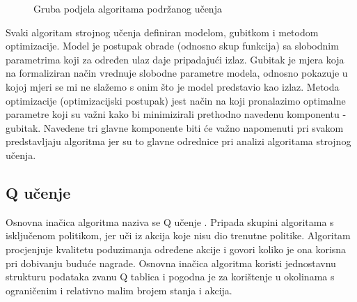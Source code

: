 
\begin{figure}[H]
    \centering
    \caption{Gruba podjela algoritama podržanog učenja \cite{RLAlgos}}
    \label{fig:rl-algorithms}
\end{figure}



Svaki algoritam strojnog učenja definiran modelom, gubitkom i metodom optimizacije. Model je postupak obrade (odnosno skup funkcija) sa slobodnim parametrima koji za određen ulaz daje pripadajući izlaz. Gubitak je mjera koja na formaliziran način vrednuje slobodne parametre modela, odnosno pokazuje u kojoj mjeri se mi ne slažemo s onim što je model predstavio kao izlaz. Metoda optimizacije (optimizacijski postupak) jest način na koji pronalazimo optimalne parametre koji su važni kako bi minimizirali prethodno navedenu komponentu - gubitak. Navedene tri glavne komponente biti će važno napomenuti pri svakom predstavljaju algoritma jer su to glavne odrednice pri analizi algoritama strojnog učenja.

\subsection{Q učenje}

Osnovna inačica algoritma naziva se Q učenje . Pripada skupini algoritama s isključenom politikom, jer uči iz akcija koje nisu dio trenutne politike. Algoritam procjenjuje kvalitetu  poduzimanja određene akcije i govori koliko je ona korisna pri dobivanju buduće nagrade. Osnovna inačica algoritma koristi jednostavnu strukturu podataka zvanu Q tablica  i pogodna je za korištenje u okolinama s ograničenim i relativno malim brojem stanja i akcija. 

